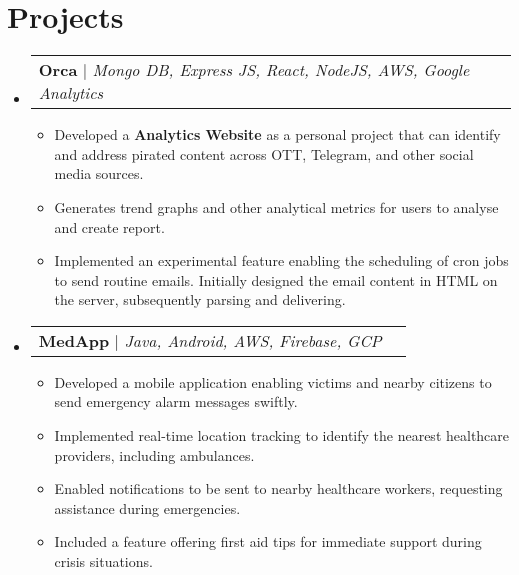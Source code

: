 \documentclass[letterpaper,11pt]{article}
\makeatletter
\newcommand{\resumeItem}[1]{
  \item\small{
    {#1 \vspace{-2pt}}
  }
}
\newcommand{\resumeProjectHeading}[2]{
    \item
    \begin{tabular*}{0.97\textwidth}{l@{\extracolsep{\fill}}r}
      \small#1 & #2 \\
    \end{tabular*}\vspace{-7pt}
}
\newcommand{\resumeSubHeadingListStart}{\begin{itemize}[leftmargin=0.15in, label={}]}
\newcommand{\resumeSubHeadingListEnd}{\end{itemize}}
\newcommand{\resumeItemListStart}{\begin{itemize}}
\newcommand{\resumeItemListEnd}{\end{itemize}\vspace{-5pt}}
\makeatother
\begin{document}
\section{Projects}
    \resumeSubHeadingListStart
      \resumeProjectHeading
          {\textbf{Orca} $|$ \emph{Mongo DB, Express JS, React, NodeJS, AWS, Google Analytics}}{}
          \resumeItemListStart
            \resumeItem{Developed a \textbf{Analytics Website} as a personal project that can identify and address pirated content across OTT, Telegram, and other social media sources.}
            \resumeItem{Generates trend graphs and other analytical metrics for users to analyse and create report.}
            \resumeItem{Implemented an experimental feature enabling the scheduling of cron jobs to send routine emails. Initially designed the email content in HTML on the server, subsequently parsing and delivering.}
          \resumeItemListEnd
      \resumeProjectHeading
          {\textbf{MedApp} $|$ \emph{Java, Android, AWS, Firebase, GCP}}{}
          \resumeItemListStart
            \resumeItem{Developed a mobile application enabling victims and nearby citizens to send emergency alarm messages swiftly.}
            \resumeItem{Implemented real-time location tracking to identify the nearest healthcare providers, including ambulances.}
            \resumeItem{Enabled notifications to be sent to nearby healthcare workers, requesting assistance during emergencies.}
            \resumeItem{Included a feature offering first aid tips for immediate support during crisis situations.}
          \resumeItemListEnd
    \resumeSubHeadingListEnd



%

\end{document}
